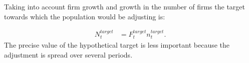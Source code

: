 \documentclass[]{article}
\begin{document}






Taking into account firm growth and growth in the number of firms the target towards which the population would be adjusting  is: 

 \begin{align}
N_t^{target}&=F_t^{target}n_t^{target}. 
\end{align} 
The precise value of the hypothetical target is less important because the adjustment is spread over several periods. %
\end{document}
